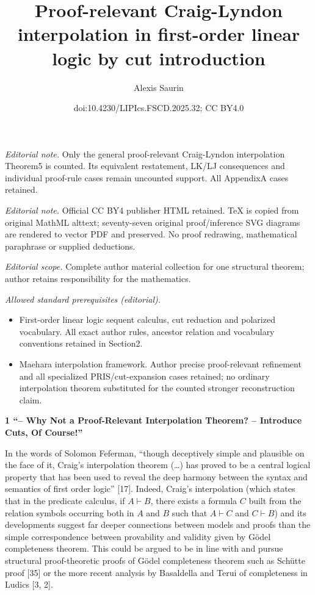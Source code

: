 \documentclass[10pt,a4paper]{article}
\title{Proof-relevant Craig-Lyndon interpolation in first-order linear logic by cut introduction}
\author{Alexis Saurin}
\date{doi:10.4230/LIPIcs.FSCD.2025.32; CC BY4.0}
\begin{document}
\maketitle
\noindent\textit{Editorial note.} Only the general proof-relevant Craig-Lyndon interpolation Theorem5 is counted. Its equivalent restatement, LK/LJ consequences and individual proof-rule cases remain uncounted support. All AppendixA cases retained.\par\medskip
\noindent\textit{Editorial note.} Official CC BY4 publisher HTML retained. TeX is copied from original MathML alttext; seventy-seven original proof/inference SVG diagrams are rendered to vector PDF and preserved. No proof redrawing, mathematical paraphrase or supplied deductions.\par\medskip
\noindent\textit{Editorial scope.} Complete author material collection for one structural theorem; author retains responsibility for the mathematics.\par\medskip
\noindent\textit{Allowed standard prerequisites (editorial).}\begin{itemize}
\item First-order linear logic sequent calculus, cut reduction and polarized vocabulary. All exact author rules, ancestor relation and vocabulary conventions retained in Section2.
\item Maehara interpolation framework. Author precise proof-relevant refinement and all specialized PRIS/cut-expansion cases retained; no ordinary interpolation theorem substituted for the counted stronger reconstruction claim.
\end{itemize}\medskip

 
\par\medskip\noindent\textbf{1 “– Why Not a Proof-Relevant Interpolation Theorem?  – Introduce Cuts, Of Course!”}\par
 
 
In the words of Solomon Feferman, “though deceptively simple and plausible on the face of it, Craig’s interpolation theorem (…) has proved to be a central logical property that has been used to reveal the deep harmony between the syntax and semantics of first order logic” [17]. Indeed, Craig’s interpolation (which states that in the predicate calculus, if $A\vdash B$, there exists a formula $C$ built from the relation symbols occurring both in $A$ and $B$ such that $A\vdash C$ and $C\vdash B$) and its developments suggest far deeper connections between models and proofs than the simple correspondence between provability and validity given by Gödel completeness theorem. This could be argued to be in line with and pursue structural proof-theoretic proofs of Gödel completeness theorem such as Schütte proof [35] or the more recent analysis by Basaldella and Terui of completeness in Ludics [3, 2].\par
 
\end{document}
